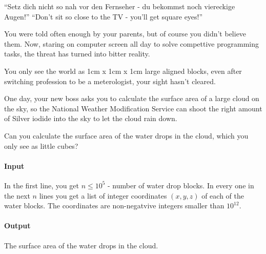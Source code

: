 



\makeheader

``Setz dich nicht so nah vor den Fernseher - du bekommst noch viereckige Augen!''
``Don't sit so close to the TV - you'll get square eyes!''

You were told often enough by your parents, but of course you didn't believe them.
Now, staring on computer screen all day to solve compettive programming tasks, the threat has turned into bitter reality.

You only see the world as 1cm x 1cm x 1cm large aligned blocks, even after switching profession to be a meterologist, your sight hasn't cleared.

One day, your new boss asks you to calculate the surface area of a large cloud on the sky, so the National Weather Modification Service can shoot the right amount of Silver iodide into the sky to let the cloud rain down.

Can you calculate the surface area of the water drops in the cloud, which you only see as little cubes?

\paragraph*{Input}

In the first line, you get $n \leq 10^5$ - number of water drop blocks.
In every one in the next $n$ lines you get a list of integer coordinates $(x, y, z)$ of each of the water blocks. The coordinates are non-negatvive integers smaller than $10^{12}$.

\paragraph*{Output}

The surface area of the water drops in the cloud.

\begin{samples}
\end{samples}

